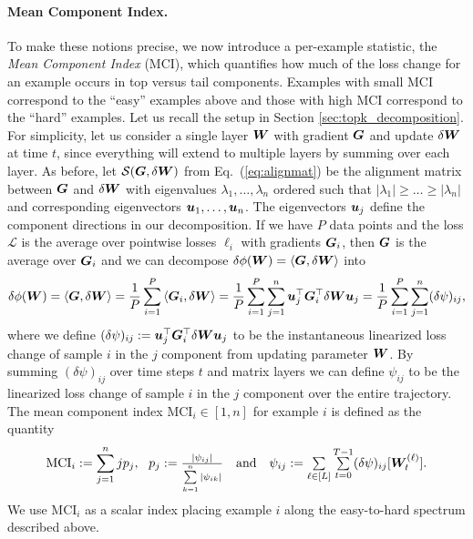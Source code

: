 \documentclass{article} %
\newcommand{\inner}[2]{\left\langle #1, #2 \right\rangle}
\newcommand{\sym}{\mathcal{S}}
\newcommand{\MCI}{\mathrm{MCI}}
\begin{document}
\paragraph{Mean Component Index.} To make these notions precise, we now introduce a per-example statistic, the \textit{Mean Component Index} (MCI), which quantifies how much of the loss change for an example occurs in top versus tail components. 
Examples with small MCI correspond to the ``easy'' examples above and those with high MCI correspond to the ``hard'' examples. Let us recall the setup in Section \ref{sec:topk_decomposition}. For simplicity, let us consider a single layer ${\boldsymbol W}$ with gradient ${\boldsymbol G}$ and update $\delta {\boldsymbol W}$ at time $t$, since everything will extend to multiple layers by summing over each layer. As before, let $\sym(\bG, \delta \bW)$ from Eq.\ (\ref{eq:alignmat}) be the alignment matrix between ${\boldsymbol G}$ and $\delta {\boldsymbol W}$ with eigenvalues $\lambda_1, \ldots, \lambda_n$ ordered such that $|\lambda_1| \geq \dots \geq |\lambda_n|$ and corresponding eigenvectors ${\boldsymbol u}_1, \ldots, {\boldsymbol u}_n$. The eigenvectors ${\boldsymbol u}_j$ define the component directions in our decomposition. 
If we have $P$ data points and the loss $\mathcal{L}$ is the average over pointwise losses $\ell_i$ with gradients ${\boldsymbol G}_i$, then ${\boldsymbol G}$ is the average over ${\boldsymbol G}_i$ and we can decompose $\delta \phi(\bW) = \inner{\bG}{\delta \bW}$ into
\[
    \delta \phi(\bW) = \inner{\bG}{\delta \bW} = \frac{1}{P} \sum\limits_{i=1}^P \inner{\bG_i}{\delta \bW} = \frac{1}{P} \sum\limits_{i=1}^P \sum\limits_{j=1}^n \bu_j^\top \bG_i^\top \delta \bW \bu_j = \frac{1}{P} \sum\limits_{i=1}^P \sum\limits_{j=1}^n (\delta \psi)_{ij},
\]
where we define $(\delta \psi)_{ij} := {\boldsymbol u}_j^\top {\boldsymbol G}_i^\top \delta {\boldsymbol W} {\boldsymbol u}_j$ to be the instantaneous linearized loss change of sample $i$ in the $j$ component from updating parameter ${\boldsymbol W}$. By summing $(\delta \psi)_{ij}$ over time steps $t$ and matrix layers we can define $\psi_{ij}$ to be the linearized loss change of sample $i$ in the $j$ component over the entire trajectory. The mean component index $\MCI_i \in [1, n]$ for example $i$ is defined as the quantity
\begin{equation}\label{eq:mean_component_index}
    \MCI_i := \sum\limits_{j = 1}^n j p_j,~~p_j := \textstyle\frac{|\psi_{ij}|}{\sum\limits_{k=1}^n |\psi_{ik}|}~~\text{ and }~~\psi_{ij} := \sum\limits_{\ell \in [L]} \sum\limits_{t=0}^{T-1} (\delta \psi)_{ij}[\bW_t^{(\ell)}].
\end{equation}
We use $\MCI_i$ as a scalar index placing example $i$ along the easy-to-hard spectrum described above. 
\end{document}
